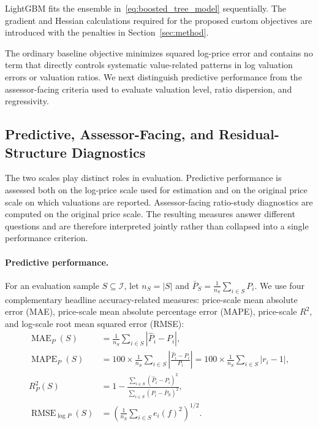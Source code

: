 \documentclass[10pt]{article}
\theoremstyle{definition}
\newcommand{\1}{\mathbf{1}}
\begin{document}
LightGBM fits the ensemble in~\eqref{eq:boosted_tree_model} sequentially. The gradient and Hessian calculations required for the proposed custom objectives are introduced with the penalties in Section~\ref{sec:method}.

{The ordinary baseline objective minimizes squared log-price error and contains no term that directly controls systematic value-related patterns in log valuation errors or valuation ratios. We next distinguish predictive performance from the assessor-facing criteria used to evaluate valuation level, ratio dispersion, and regressivity.}


\subsection{
\texorpdfstring{
Predictive, Assessor-Facing, and Residual-Structure Diagnostics}{Predictive, Assessor-Facing, and Residual-Structure Diagnostics}}
\label{subsec:metrics}


{The two scales play distinct roles in evaluation. Predictive performance is assessed both on the log-price scale used for estimation and on the original price scale on which valuations are reported. Assessor-facing ratio-study diagnostics are computed on the original price scale. The resulting measures answer different questions and are therefore interpreted jointly rather than collapsed into a single performance criterion.}

\paragraph{Predictive performance.}
{For an evaluation sample $S\subseteq\mathcal{I}$, let $n_S=|S|$ and $\bar P_S=\frac{1}{n_S}\sum_{i\in S}P_i$. We use four complementary headline accuracy-related measures: price-scale mean absolute error (MAE), price-scale mean absolute percentage error (MAPE), price-scale $R^2$, and log-scale root mean squared error (RMSE):}
\begin{align}
\label{eq:predictive_metrics}
\operatorname{MAE}_{P}(S)
&=
\frac{1}{n_S}\sum_{i\in S}\left|\widehat P_i-P_i\right|,
\\
{\operatorname{MAPE}_{P}(S)}
&{=100\times
\frac{1}{n_S}
\sum_{i\in S}
\left|
\frac{\widehat P_i-P_i}{P_i}
\right|
=100\times
\frac{1}{n_S}\sum_{i\in S}|r_i-1|},
\\
R^2_{P}(S)
&=
1-
\frac{\sum_{i\in S}(\widehat P_i-P_i)^2}
{\sum_{i\in S}(P_i-\bar P_S)^2},
\\
\operatorname{RMSE}_{\log P}(S)
&=
\left(
\frac{1}{n_S}\sum_{i\in S}e_i(f)^2
\right)^{1/2}.
\end{align}
\end{document}
